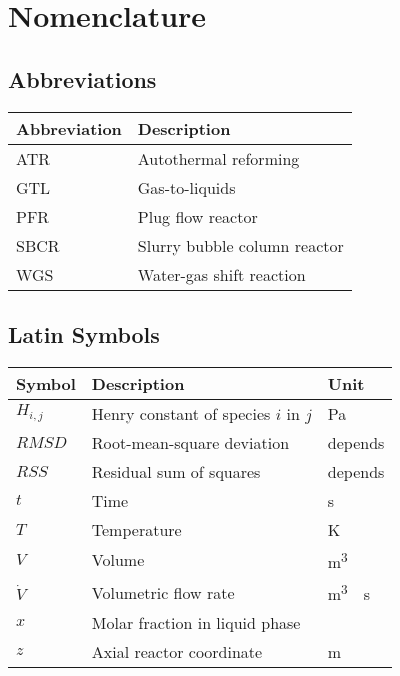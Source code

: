 \chapter*{Nomenclature}

\section*{Abbreviations}
\begin{longtabu} to \textwidth {XX[5]}
	\toprule
	\textbf{Abbreviation} 		& \textbf{Description}\\ 
	\midrule		\endhead
	\bottomrule 	\endfoot
	ATR		& Autothermal reforming\\
	GTL		& Gas-to-liquids\\
	PFR		& Plug flow reactor \\
	SBCR	& Slurry bubble column reactor\\
	WGS		& Water-gas shift reaction\\
\end{longtabu}


\section*{Latin Symbols}
\begin{longtabu} to \textwidth {XX[4]X[c]}
	\toprule
	\textbf{Symbol} 		& \textbf{Description}		 							& \textbf{Unit} \\ 
	\midrule		\endhead
	\bottomrule 	\endfoot
	$H_{i,j}$		& Henry constant of species $i$ in $j$							& \si{\pascal} \\
	$RMSD$			& Root-mean-square deviation									& depends \\
	$RSS$			& Residual sum of squares										& depends \\
	$t$				& Time															& \si{\second} \\
	$T$				& Temperature													& \si{\kelvin} \\
	$V$				& Volume														& \si{\meter^3} \\
	$\dot{V}$		& Volumetric flow rate											& \si{\meter^3 \per \second} \\
	$x$				& Molar fraction in liquid phase								& \textendash \\
	$z$				& Axial reactor coordinate										& \si{\meter} \\
\end{longtabu}
\pagebreak

